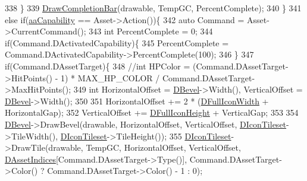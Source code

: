 \begin{DoxyCode}
338                             \}
339                             \hyperlink{classCUnitDescriptionRenderer_a1faaa0097504c0ccf2f8017449324377}{DrawCompletionBar}(drawable, TempGC, PercentComplete);
340                         \}
341                         \textcolor{keywordflow}{else} \textcolor{keywordflow}{if}(\hyperlink{GameDataTypes_8h_ab47668e651a3032cfb9c40ea2d60d670acf9fb164e8abd71c71f4a8c7fda360d4}{aaCapability} == Asset->Action())\{
342                             \textcolor{keyword}{auto} Command = Asset->CurrentCommand();
343                             \textcolor{keywordtype}{int} PercentComplete = 0;
344                             \textcolor{keywordflow}{if}(Command.DActivatedCapability)\{
345                                 PercentComplete = Command.DActivatedCapability->PercentComplete(100);
346                             \}
347                             \textcolor{keywordflow}{if}(Command.DAssetTarget)\{
348                                 \textcolor{comment}{//int HPColor = (Command.DAssetTarget->HitPoints() - 1) * MAX\_HP\_COLOR /
       Command.DAssetTarget->MaxHitPoints();}
349                                 \textcolor{keywordtype}{int} HorizontalOffset = \hyperlink{classCUnitDescriptionRenderer_a9f4cd9f9d8dbc5036c885980494db41e}{DBevel}->Width(), VerticalOffset = 
      \hyperlink{classCUnitDescriptionRenderer_a9f4cd9f9d8dbc5036c885980494db41e}{DBevel}->Width();
350                                 
351                                 HorizontalOffset += 2 * (\hyperlink{classCUnitDescriptionRenderer_a4bd79032fe13b9c09386a24cb8ef7650}{DFullIconWidth} + HorizontalGap);
352                                 VerticalOffset += \hyperlink{classCUnitDescriptionRenderer_ae9f7d843d0eabd4b1f1b19bfa5332754}{DFullIconHeight} + VerticalGap;
353                                 
354                                 \hyperlink{classCUnitDescriptionRenderer_a9f4cd9f9d8dbc5036c885980494db41e}{DBevel}->DrawBevel(drawable, HorizontalOffset, VerticalOffset, 
      \hyperlink{classCUnitDescriptionRenderer_aadf76b5c018d76c3ff7bd8edc021d702}{DIconTileset}->TileWidth(), \hyperlink{classCUnitDescriptionRenderer_aadf76b5c018d76c3ff7bd8edc021d702}{DIconTileset}->TileHeight());
355                                 \hyperlink{classCUnitDescriptionRenderer_aadf76b5c018d76c3ff7bd8edc021d702}{DIconTileset}->DrawTile(drawable, TempGC, HorizontalOffset, 
      VerticalOffset, \hyperlink{classCUnitDescriptionRenderer_a3d311375ab23745786d20076842e3099}{DAssetIndices}[Command.DAssetTarget->Type()], Command.DAssetTarget->Color() ? 
      Command.DAssetTarget->Color() - 1 : 0);

\end{DoxyCode}
